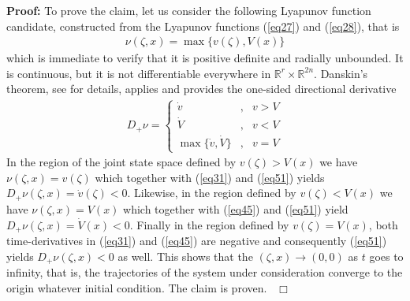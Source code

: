 \documentclass[twocolumn]{autarc_LH}
\newcommand{\Rf}{{\mathbb R}}
\newenvironment{proof}{\begin{trivlist} \item[{ \bf Proof:}] }
{~\hfill$\Box$ \end{trivlist} }
\begin{document}
\begin{proof} To prove the claim, let us consider the following Lyapunov function candidate, constructed from the Lyapunov functions (\ref{eq27}) and (\ref{eq28}), that is
\begin{align} 
\label{eq50}  \nu(\zeta, x) = \max\{ v(\zeta), V(x) \} 
\end{align}
which is immediate to verify that it is positive definite and radially unbounded. It is continuous, but it is not differentiable everywhere in $\Rf^{r} \times \Rf^{2n}$. Danskin's theorem, see \cite{Lasdon_book:1970} for details, applies and provides the one-sided directional derivative 
\begin{align} 
\label{eq51}  D_+ \nu = \left \{ \begin{array}{ccc} \dot v &,& v > V \\  \dot V &,& v < V \\  \max\{\dot v, \dot V \} &,& v = V \end{array} \right .   
\end{align}
In the region of the joint state space defined by $v(\zeta) > V(x)$ we have $\nu(\zeta,x) = v(\zeta)$ which together with (\ref{eq31}) and (\ref{eq51}) yields $D_+ \nu(\zeta,x) = \dot v(\zeta) < 0$. Likewise, in the region defined by $v(\zeta) < V(x)$ we have $\nu(\zeta,x) = V(x)$ which together with (\ref{eq45}) and (\ref{eq51}) yield $D_+ \nu(\zeta,x) = \dot V(x) < 0$. Finally in the region defined by $v(\zeta) = V(x)$, both time-derivatives in (\ref{eq31}) and (\ref{eq45}) are negative and consequently (\ref{eq51}) yields $D_+ \nu(\zeta,x)<0$ as well. This shows that the $(\zeta, x) \rightarrow (0,0)$ as $t$ goes to infinity, that is, the trajectories of the system under consideration converge to the origin whatever initial condition. The claim is proven.    
\end{proof}
\end{document}
